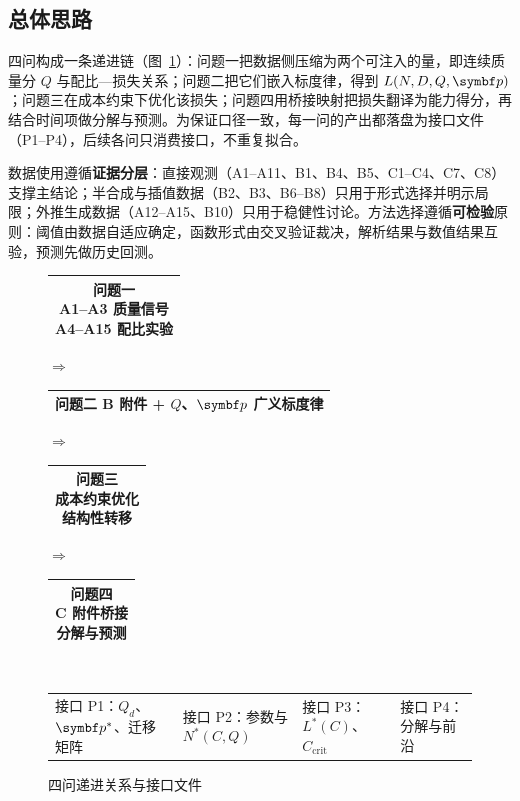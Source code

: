 \subsection{总体思路}

四问构成一条递进链（图~\ref{fig:flow}）：问题一把数据侧压缩为两个可注入的量，即连续质量分 $Q$ 与配比—损失关系；问题二把它们嵌入标度律，得到 $L(N,D,Q,\bp)$；问题三在成本约束下优化该损失；问题四用桥接映射把损失翻译为能力得分，再结合时间项做分解与预测。为保证口径一致，每一问的产出都落盘为接口文件（P1–P4），后续各问只消费接口，不重复拟合。

数据使用遵循\textbf{证据分层}：直接观测（A1–A11、B1、B4、B5、C1–C4、C7、C8）支撑主结论；半合成与插值数据（B2、B3、B6–B8）只用于形式选择并明示局限；外推生成数据（A12–A15、B10）只用于稳健性讨论。方法选择遵循\textbf{可检验}原则：阈值由数据自适应确定，函数形式由交叉验证裁决，解析结果与数值结果互验，预测先做历史回测。

\begin{figure}[H]
\centering\small
\setlength{\tabcolsep}{3pt}
\begin{tabular}{|c|}\hline\makecell{\textbf{问题一}\\A1–A3 质量信号\\A4–A15 配比实验}\\\hline\end{tabular}
$\Rightarrow$
\begin{tabular}{|c|}\hline\makecell{\textbf{问题二}\\B 附件 + $Q$、$\bp$\\广义标度律}\\\hline\end{tabular}
$\Rightarrow$
\begin{tabular}{|c|}\hline\makecell{\textbf{问题三}\\成本约束优化\\结构性转移}\\\hline\end{tabular}
$\Rightarrow$
\begin{tabular}{|c|}\hline\makecell{\textbf{问题四}\\C 附件桥接\\分解与预测}\\\hline\end{tabular}\\[4pt]
{\footnotesize\begin{tabular}{llll}
接口 P1：$Q_d$、$\bp^*$、迁移矩阵 &
接口 P2：参数与 $N^*(C,Q)$ &
接口 P3：$L^*(C)$、$C_{\mathrm{crit}}$ &
接口 P4：分解与前沿
\end{tabular}}
\caption{四问递进关系与接口文件}
\label{fig:flow}
\end{figure}

